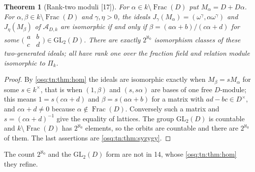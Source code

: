\documentclass[11pt,letterpaper]{article}
\numberwithin{equation}{section}
\newtheorem{theorem}{Theorem}[section]
\theoremstyle{definition}
\theoremstyle{remark}
\theoremstyle{plain}
\newcommand{\A}{\mathcal A}          %
\newcommand{\Frac}{\operatorname{Frac}}
\newcommand{\src}[1]{\textup{\textsf{[#1]}}}
\begin{document}
\begin{theorem}[Rank-two moduli \src{17}]\label{osq:rel:thm:mobius}
For $\alpha\in k\setminus\Frac(D)$ put $M_\alpha=D+D\alpha$. For $\alpha,\beta\in k\setminus\Frac(D)$ and $\gamma,\eta>0$, the ideals
$J_\gamma(M_\alpha)=(\omega^\gamma,\alpha\omega^\gamma)$ and $J_\eta(M_\beta)$ of $\A_{D,k}$ are isomorphic if and only if
$\beta=(a\alpha+b)/(c\alpha+d)$ for some $\bigl(\begin{smallmatrix}a&b\\c&d\end{smallmatrix}\bigr)\in\mathrm{GL}_2(D)$. There are
exactly $2^{\aleph_0}$ isomorphism classes of these two-generated ideals; all have rank one over the fraction field and relation
module isomorphic to $\Pi_k$.
\end{theorem}
\begin{proof}
By \cref{osq:tn:thm:hom} the ideals are isomorphic exactly when $M_\beta=sM_\alpha$ for some $s\in k^\times$, that is when
$(1,\beta)$ and $(s,s\alpha)$ are bases of one free $D$-module; this means $1=s(c\alpha+d)$ and $\beta=s(a\alpha+b)$ for a matrix with
$ad-bc\in D^\times$, and $c\alpha+d\ne0$ because $\alpha\notin\Frac(D)$. Conversely such a matrix and $s=(c\alpha+d)^{-1}$ give the
equality of lattices. The group $\mathrm{GL}_2(D)$ is countable and $k\setminus\Frac(D)$ has $2^{\aleph_0}$ elements, so the orbits
are countable and there are $2^{\aleph_0}$ of them. The last assertions are \cref{osq:tn:thm:syzygy}.
\end{proof}

The count $2^{\aleph_0}$ and the $\mathrm{GL}_2(D)$ form are not in 14, whose \cref{osq:tn:thm:hom} they refine.
\end{document}
